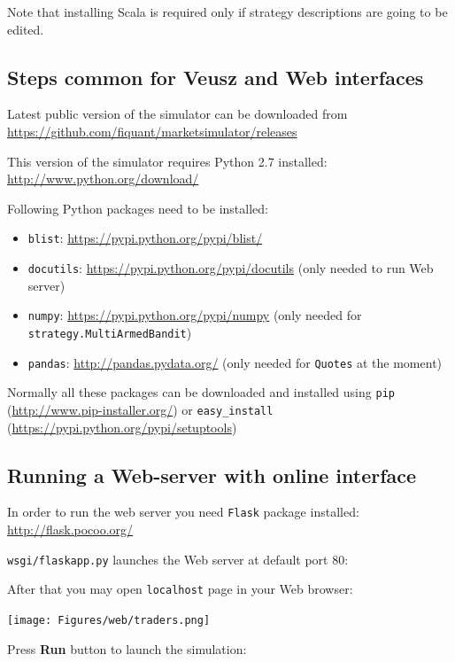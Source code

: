 \documentclass[a4paper,11pt]{article}
\begin{document}
Note that installing Scala is required only if strategy descriptions are
going to be edited.

\subsection{Steps common for Veusz and Web
interfaces}\label{steps-common-for-veusz-and-web-interfaces}

Latest public version of the simulator can be downloaded from
\url{https://github.com/fiquant/marketsimulator/releases}

This version of the simulator requires Python 2.7 installed:
\url{http://www.python.org/download/}

Following Python packages need to be installed:

\begin{itemize}
\itemsep1pt\parskip0pt
\item
  \texttt{blist}: \url{https://pypi.python.org/pypi/blist/}
\item
  \texttt{docutils}: \url{https://pypi.python.org/pypi/docutils} (only
  needed to run Web server)
\item
  \texttt{numpy}: \url{https://pypi.python.org/pypi/numpy} (only needed
  for \texttt{strategy.MultiArmedBandit})
\item
  \texttt{pandas}: \url{http://pandas.pydata.org/} (only needed for
  \texttt{Quotes} at the moment)
\end{itemize}

Normally all these packages can be downloaded and installed using
\texttt{pip} (\url{http://www.pip-installer.org/}) or
\texttt{easy\_install} (\url{https://pypi.python.org/pypi/setuptools})

\subsection{Running a Web-server with online
interface}\label{running-a-web-server-with-online-interface}

In order to run the web server you need \texttt{Flask} package
installed: \url{http://flask.pocoo.org/}

\texttt{wsgi/flaskapp.py} launches the Web server at default port 80:

After that you may open \texttt{localhost} page in your Web browser:

\centerline{\texttt{[image: Figures/web/traders.png]}}

Press \textbf{Run} button to launch the simulation:
\end{document}
